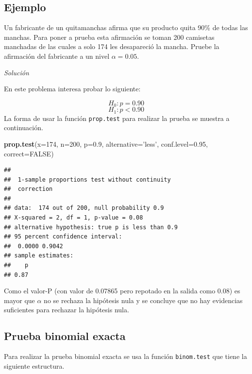 \documentclass[10pt,]{krantz}
\makeatletter
\newenvironment{Shaded}{\begin{snugshade}}{\end{snugshade}}
\newcommand{\KeywordTok}[1]{\textcolor[rgb]{0.13,0.29,0.53}{\textbf{#1}}}
\newcommand{\DataTypeTok}[1]{\textcolor[rgb]{0.13,0.29,0.53}{#1}}
\newcommand{\DecValTok}[1]{\textcolor[rgb]{0.00,0.00,0.81}{#1}}
\newcommand{\FloatTok}[1]{\textcolor[rgb]{0.00,0.00,0.81}{#1}}
\newcommand{\StringTok}[1]{\textcolor[rgb]{0.31,0.60,0.02}{#1}}
\newcommand{\OtherTok}[1]{\textcolor[rgb]{0.56,0.35,0.01}{#1}}
\newcommand{\NormalTok}[1]{#1}
\newenvironment{kframe}{%
\medskip{}
\setlength{\fboxsep}{.8em}
 \def\at@end@of@kframe{}%
 \ifinner\ifhmode%
  \def\at@end@of@kframe{\end{minipage}}%
  \begin{minipage}{\columnwidth}%
 \fi\fi%
 \def\FrameCommand##1{\hskip\@totalleftmargin \hskip-\fboxsep
 \colorbox{shadecolor}{##1}\hskip-\fboxsep
     \hskip-\linewidth \hskip-\@totalleftmargin \hskip\columnwidth}%
 \MakeFramed {\advance\hsize-\width
   \@totalleftmargin\z@ \linewidth\hsize
   \@setminipage}}%
 {\par\unskip\endMakeFramed%
 \at@end@of@kframe}
\renewenvironment{Shaded}{\begin{kframe}}{\end{kframe}}
\makeatother
\begin{document}
\subsection*{Ejemplo}\label{ejemplo-66}


Un fabricante de un quitamanchas afirma que su producto quita 90\% de
todas las manchas. Para poner a prueba esta afirmación se toman 200
camisetas manchadas de las cuales a solo 174 les desapareció la mancha.
Pruebe la afirmación del fabricante a un nivel \(\alpha=0.05\).

\emph{Solución}

En este problema interesa probar lo siguiente:

\[H_0: p = 0.90\] \[H_1: p < 0.90\] La forma de usar la función
\texttt{prop.test} para realizar la prueba se muestra a continuación.

\begin{Shaded}
\begin{Highlighting}[]
\KeywordTok{prop.test}\NormalTok{(}\DataTypeTok{x=}\DecValTok{174}\NormalTok{, }\DataTypeTok{n=}\DecValTok{200}\NormalTok{, }\DataTypeTok{p=}\FloatTok{0.9}\NormalTok{, }\DataTypeTok{alternative=}\StringTok{'less'}\NormalTok{,}
          \DataTypeTok{conf.level=}\FloatTok{0.95}\NormalTok{, }\DataTypeTok{correct=}\OtherTok{FALSE}\NormalTok{)}
\end{Highlighting}
\end{Shaded}

\begin{verbatim}
## 
##  1-sample proportions test without continuity
##  correction
## 
## data:  174 out of 200, null probability 0.9
## X-squared = 2, df = 1, p-value = 0.08
## alternative hypothesis: true p is less than 0.9
## 95 percent confidence interval:
##  0.0000 0.9042
## sample estimates:
##    p 
## 0.87
\end{verbatim}

Como el valor-P (con valor de 0.07865 pero repotado en la salida como
0.08) es mayor que \(\alpha\) no se rechaza la hipótesis nula y se
concluye que no hay evidencias suficientes para rechazar la hipótesis
nula.

\subsection{Prueba binomial exacta}\label{prueba-binomial-exacta}

Para realizar la prueba binomial exacta se usa la función
\texttt{binom.test} que tiene la siguiente estructura.
\end{document}

